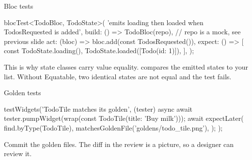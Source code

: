 \documentclass[10pt,aspectratio=169,t]{beamer}
\begin{document}
\begin{frame}[fragile,eyebrow=Testing]{Bloc tests}
\begin{dart}
blocTest<TodoBloc, TodoState>(
  'emits loading then loaded when TodosRequested is added',
  build: () => TodoBloc(repo),          // repo is a mock, see previous slide
  act: (bloc) => bloc.add(const TodosRequested()),
  expect: () => [
    const TodoState.loading(),
    TodoState.loaded([Todo(id: 1)]),
  ],
);
\end{dart}
  \begin{takeaway}{This is why state classes carry value equality.}
     compares the emitted states to your list. Without Equatable, two identical states are not equal and the test fails.
  \end{takeaway}
\end{frame}

\begin{frame}[fragile,eyebrow=Testing]{Golden tests}
\begin{dart}
testWidgets('TodoTile matches its golden', (tester) async {
  await tester.pumpWidget(wrap(const TodoTile(title: 'Buy milk')));
  await expectLater(
    find.byType(TodoTile),
    matchesGoldenFile('goldens/todo_tile.png'),
  );
});
\end{dart}
  \vskip 2mm
  \begin{takeaway}{Commit the golden files.}
    The diff in the review is a picture, so a designer can review it.
  \end{takeaway}
\end{frame}
\end{document}

